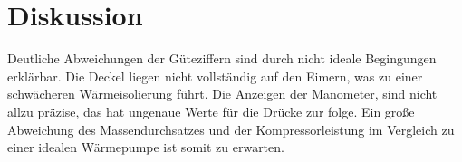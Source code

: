 \section{Diskussion}
\label{sec:Diskussion}

Deutliche Abweichungen der Güteziffern sind durch nicht ideale Begingungen erklärbar.
Die Deckel liegen nicht vollständig auf den Eimern, was zu einer schwächeren
Wärmeisolierung führt. Die Anzeigen der Manometer, sind nicht allzu präzise, das hat
ungenaue Werte für die Drücke zur folge. Ein große Abweichung des Massendurchsatzes
und der Kompressorleistung im Vergleich zu einer idealen Wärmepumpe ist somit zu
erwarten.
